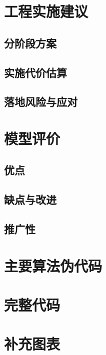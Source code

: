 \documentclass[12pt,a4paper]{ctexart}
\begin{document}
\section{工程实施建议}

\subsection{分阶段方案}

\subsection{实施代价估算}

\subsection{落地风险与应对}

\section{模型评价}

\subsection{优点}

\subsection{缺点与改进}

\subsection{推广性}





\appendix

\section{主要算法伪代码}

\section{完整代码}


\section{补充图表}
\end{document}
